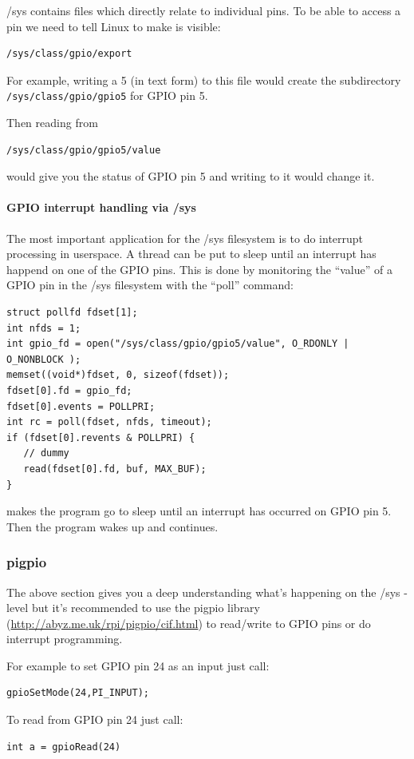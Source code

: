 \documentclass[12pt]{report}
\begin{document}
/sys contains files which directly relate to individual pins.
To be able to access a pin we need to tell Linux to make
is visible:
\begin{verbatim}
/sys/class/gpio/export
\end{verbatim}
For example, writing a 5 (in text form) to this file would
create the subdirectory \texttt{/sys/class/gpio/gpio5} for GPIO pin 5.

Then reading from
\begin{verbatim}
/sys/class/gpio/gpio5/value
\end{verbatim}
would give you the status of GPIO pin 5 and writing
to it would change it.

\paragraph{GPIO interrupt handling via /sys}
The most important application for the /sys filesystem is to
do interrupt processing in userspace.
A thread can be put to sleep until an interrupt has happend on one of
the GPIO pins. This is done by monitoring the ``value''
of a GPIO pin in the /sys filesystem with the ``poll'' command:
\begin{verbatim}
struct pollfd fdset[1];
int nfds = 1;
int gpio_fd = open("/sys/class/gpio/gpio5/value", O_RDONLY | O_NONBLOCK );
memset((void*)fdset, 0, sizeof(fdset));
fdset[0].fd = gpio_fd;
fdset[0].events = POLLPRI;
int rc = poll(fdset, nfds, timeout);
if (fdset[0].revents & POLLPRI) {
   // dummy
   read(fdset[0].fd, buf, MAX_BUF);
}
\end{verbatim}
makes the program go to sleep until an interrupt has occurred on
GPIO pin 5. Then the program wakes up and continues.

\subsubsection{pigpio}
The above section gives you a deep understanding what's happening
on the /sys - level but it's recommended to
use the pigpio library (\url{http://abyz.me.uk/rpi/pigpio/cif.html})
to read/write to GPIO pins or do interrupt programming.

For example to set GPIO pin 24 as an input just call:
\begin{verbatim}
gpioSetMode(24,PI_INPUT);
\end{verbatim}

To read from GPIO pin 24 just call:
\begin{verbatim}
int a = gpioRead(24)
\end{verbatim}
\end{document}

